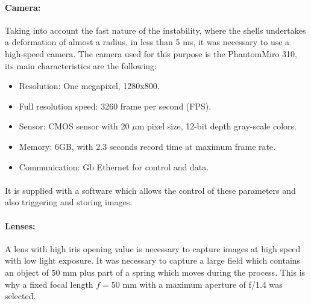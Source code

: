 \paragraph{Camera:}
Taking into account the fast nature of the instability, where the shells undertakes a deformation of almost a radius, in less than 5 ms, it was necessary to use a high-speed camera.
The camera used for this purpose is the Phantom\textcopyright Miro 310, its main characteristics are the following:
\begin{itemize}
	\item Resolution: One megapixel, 1280x800.
	\item Full resolution speed: 3260 frame per second (FPS).
	\item Sensor: CMOS sensor with 20 $\mu$m pixel size, 12-bit depth gray-scale colors.
	\item Memory: 6GB, with 2.3 seconds record time at maximum frame rate.
	\item Communication: Gb Ethernet for control and data.
\end{itemize}
\paragraph{}
It is supplied with a software which allows the control of these parameters and also triggering and storing images.
\paragraph{Lenses:}
A lens with high iris opening value is necessary to capture images at high speed with low light exposure. It was necessary to capture a large field which contains an object of 50 mm plus part of a spring which moves during the process. This is why a fixed focal length $f= 50$ mm with a maximum aperture of f/1.4 was selected.

